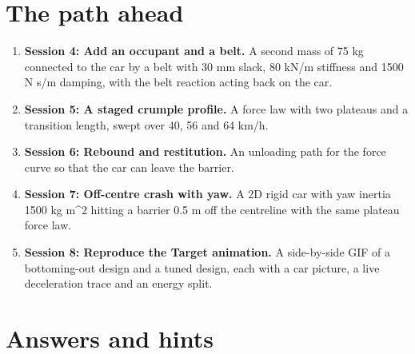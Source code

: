 \documentclass[11pt,a4paper]{article}
\begin{document}
\section{The path ahead}
\begin{enumerate}[nosep]
\item \textbf{Session 4: Add an occupant and a belt.} A second mass of 75 kg connected to the car by a belt with 30 mm slack, 80 kN/m stiffness and 1500 N s/m damping, with the belt reaction acting back on the car.
\item \textbf{Session 5: A staged crumple profile.} A force law with two plateaus and a transition length, swept over 40, 56 and 64 km/h.
\item \textbf{Session 6: Rebound and restitution.} An unloading path for the force curve so that the car can leave the barrier.
\item \textbf{Session 7: Off-centre crash with yaw.} A 2D rigid car with yaw inertia 1500 kg m\textasciicircum{}2 hitting a barrier 0.5 m off the centreline with the same plateau force law.
\item \textbf{Session 8: Reproduce the Target animation.} A side-by-side GIF of a bottoming-out design and a tuned design, each with a car picture, a live deceleration trace and an energy split.
\end{enumerate}

\section{Answers and hints}
\end{document}
